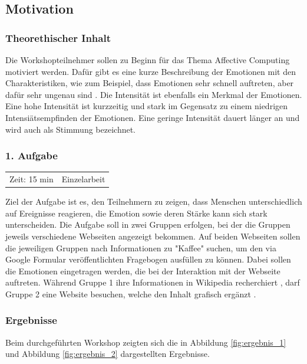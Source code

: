 \subsection{Motivation}
\subsubsection*{Theorethischer Inhalt}
Die Workshopteilnehmer sollen zu Beginn für das Thema Affective Computing motiviert werden. Dafür gibt es eine kurze Beschreibung der Emotionen mit den Charakteristiken, wie zum Beispiel, dass Emotionen sehr schnell auftreten, aber dafür sehr ungenau sind \cite{emotioneninfo}. Die Intensität ist ebenfalls ein Merkmal der Emotionen. Eine hohe Intensität ist kurzzeitig und stark im Gegensatz zu einem niedrigen Intensiätsempfinden der Emotionen. Eine geringe Intensität dauert länger an und wird auch als Stimmung bezeichnet. 

\vspace{3mm}
\subsubsection*{1. Aufgabe}	
\begin{tabular}{c c}
	Zeit: 15 min & Einzelarbeit\\
\end{tabular}
\vspace{1mm}

Ziel der Aufgabe ist es, den Teilnehmern zu zeigen, dass Menschen unterschiedlich auf Ereignisse reagieren, die Emotion sowie deren Stärke kann sich stark unterscheiden. Die Aufgabe soll in zwei Gruppen erfolgen, bei der die Gruppen jeweils verschiedene Webseiten angezeigt bekommen. Auf beiden Webseiten sollen die jeweiligen Gruppen nach Informationen zu "Kaffee" suchen, um den via Google Formular veröffentlichten Fragebogen ausfüllen zu können. Dabei sollen die Emotionen eingetragen werden, die bei der Interaktion mit der Webseite auftreten. Während Gruppe 1 ihre Informationen in Wikipedia recherchiert \cite{kaffeewiki}, darf Gruppe 2 eine Website besuchen, welche den Inhalt grafisch ergänzt \cite{kaffecss}. \newline


\subsubsection*{Ergebnisse}
Beim durchgeführten Workshop zeigten sich die in Abbildung \ref{fig:ergebnis_1} und Abbildung \ref{fig:ergebnis_2} dargestellten Ergebnisse.

